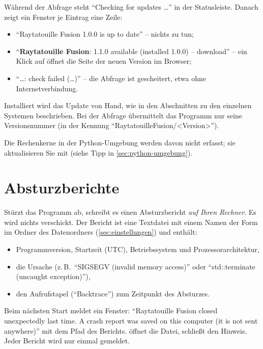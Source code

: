 Während der Abfrage steht \enquote{Checking for updates \dots} in der Statusleiste. Danach
zeigt ein Fenster  je Eintrag eine Zeile:

\begin{itemize}
  \item \enquote{Raytatouille Fusion 1.0.0 is up to date} -- nichts zu tun;
  \item \enquote{\textbf{Raytatouille Fusion}: 1.1.0 available (installed 1.0.0) --
    download} -- ein Klick auf  öffnet die Seite der neuen Version im Browser;
  \item \enquote{\dots: check failed (\dots)} -- die Abfrage ist gescheitert, etwa ohne
    Internetverbindung.
\end{itemize}

Installiert wird das Update von Hand, wie in den Abschnitten zu den einzelnen Systemen
beschrieben. Bei der Abfrage übermittelt das Programm nur seine Versionsnummer (in der
Kennung \enquote{RaytatouilleFusion/<Version>}).

Die Rechenkerne in der Python-Umgebung werden davon nicht erfasst; sie aktualisieren Sie mit
 (siehe Tipp in \autoref{sec:python-umgebung}).

\section{Absturzberichte}\label{sec:absturzberichte}

Stürzt das Programm ab, schreibt es einen Absturzbericht \emph{auf Ihren Rechner}. Es wird
nichts verschickt. Der Bericht ist eine Textdatei mit
einem Namen der Form\\  im Ordner  des
Datenordners (\autoref{sec:einstellungen}) und enthält:

\begin{itemize}
  \item Programmversion, Startzeit (UTC), Betriebssystem und Prozessorarchitektur,
  \item die Ursache (z.\,B.\ \enquote{SIGSEGV (invalid memory access)} oder
    \enquote{std::terminate (uncaught exception)}),
  \item den Aufrufstapel (\enquote{Backtrace}) zum Zeitpunkt des Absturzes.
\end{itemize}

Beim nächsten Start meldet ein Fenster: \enquote{Raytatouille Fusion closed unexpectedly last
time. A crash report was saved on this computer (it is not sent anywhere)} mit dem Pfad des
Berichts.  öffnet die Datei,  schließt den Hinweis. Jeder Bericht wird
nur einmal gemeldet.

